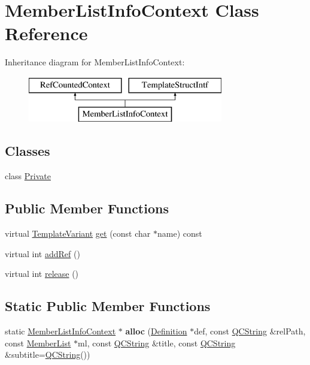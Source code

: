 \hypertarget{class_member_list_info_context}{}\section{Member\+List\+Info\+Context Class Reference}
\label{class_member_list_info_context}
Inheritance diagram for Member\+List\+Info\+Context\+:\begin{figure}[H]
\begin{center}
\leavevmode
\includegraphics[height=2.000000cm]{class_member_list_info_context}
\end{center}
\end{figure}
\subsection*{Classes}
\begin{DoxyCompactItemize}
\item 
class \mbox{\hyperlink{class_member_list_info_context_1_1_private}{Private}}
\end{DoxyCompactItemize}
\subsection*{Public Member Functions}
\begin{DoxyCompactItemize}
\item 
virtual \mbox{\hyperlink{class_template_variant}{Template\+Variant}} \mbox{\hyperlink{class_member_list_info_context_af2f73ee537f6709ca2549c9d8f9444fa}{get}} (const char $\ast$name) const
\item 
virtual int \mbox{\hyperlink{class_member_list_info_context_a8c6f32abaf9278db133168c67a821215}{add\+Ref}} ()
\item 
virtual int \mbox{\hyperlink{class_member_list_info_context_a86721904ec41349332da05e5cb3325d9}{release}} ()
\end{DoxyCompactItemize}
\subsection*{Static Public Member Functions}
\begin{DoxyCompactItemize}
\item 
\mbox{\label{class_member_list_info_context_a51c25e2e65e4241a5333e28ad447abe3}} 
static \mbox{\hyperlink{class_member_list_info_context}{Member\+List\+Info\+Context}} $\ast$ {\bfseries alloc} (\mbox{\hyperlink{class_definition}{Definition}} $\ast$def, const \mbox{\hyperlink{class_q_c_string}{Q\+C\+String}} \&rel\+Path, const \mbox{\hyperlink{class_member_list}{Member\+List}} $\ast$ml, const \mbox{\hyperlink{class_q_c_string}{Q\+C\+String}} \&title, const \mbox{\hyperlink{class_q_c_string}{Q\+C\+String}} \&subtitle=\mbox{\hyperlink{class_q_c_string}{Q\+C\+String}}())
\end{DoxyCompactItemize}


